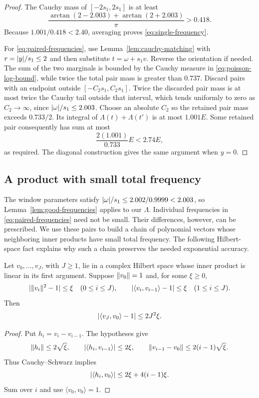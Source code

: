 \begin{proof}
The Cauchy mass of $[-2s_1,2s_1]$ is at least
\[
 \frac{\arctan(2-2.003)+\arctan(2+2.003)}\pi>0.418.
\]
Because $1.001/0.418<2.40$, averaging proves
\eqref{eq:single-frequency}.

For \eqref{eq:paired-frequencies}, use Lemma~\ref{lem:cauchy-matching} with
$r=\lvert y\rvert/s_1\le2$ and then substitute $t=\omega+s_1v$.  Reverse the
orientation if needed.  The sum of the two marginals is bounded by the
Cauchy measure in \eqref{eq:poisson-log-bound}, while twice the total pair
mass is greater than $0.737$.  Discard pairs with an endpoint outside
$[-C_2s_1,C_2s_1]$.  Twice the discarded pair mass is at most twice the
Cauchy tail outside that interval, which tends uniformly to zero as
$C_2\to\infty$, since $\lvert \omega\rvert/s_1\le2.003$.
Choose an absolute $C_2$ so the retained pair mass exceeds $0.733/2$.
Its integral of $\Lambda(t)+\Lambda(t')$ is at most $1.001E$.  Some retained
pair consequently has sum at most
\[
 \frac{2(1.001)}{0.733}E<2.74E,
\]
as required.  The diagonal construction gives the same argument when $y=0$.
\end{proof}

\subsection{A product with small total frequency}

The window parameters satisfy $\lvert \omega\rvert/s_1\le2.002/0.9999<2.003$, so
Lemma~\ref{lem:good-frequencies} applies to our $\Lambda$.
Individual frequencies in \eqref{eq:paired-frequencies} need not be small.
Their differences, however, can be prescribed.  We use these pairs to build
a chain of polynomial vectors whose neighboring inner products have small
total frequency.  The following Hilbert-space fact explains why such a chain
preserves the needed exponential accuracy.

\begin{lemma}\label{lem:gram-chain}
Let $v_0,\ldots,v_J$, with $J\ge1$, lie in a complex Hilbert space whose
inner product is linear in its first argument.  Suppose $\lVert v_0\rVert=1$ and,
for some $\xi\ge0$,
\[
 \lvert \lVert v_i\rVert^2-1\rvert\le\xi\quad(0\le i\le J),\qquad
 \lvert \langle v_i,v_{i-1}\rangle-1\rvert\le\xi\quad(1\le i\le J).
\]
Then
\[
 \lvert \langle v_J,v_0\rangle-1\rvert\le2J^2\xi.
\]
\end{lemma}

\begin{proof}
Put $h_i=v_i-v_{i-1}$.  The hypotheses give
\[
 \lVert h_i\rVert\le2\sqrt\xi,\qquad
 \lvert \langle h_i,v_{i-1}\rangle\rvert\le2\xi,
 \qquad \lVert v_{i-1}-v_0\rVert\le2(i-1)\sqrt\xi.
\]
Thus Cauchy--Schwarz implies
\[
 \lvert \langle h_i,v_0\rangle\rvert
 \le2\xi+4(i-1)\xi.
\]
Sum over $i$ and use $\langle v_0,v_0\rangle=1$.
\end{proof}

